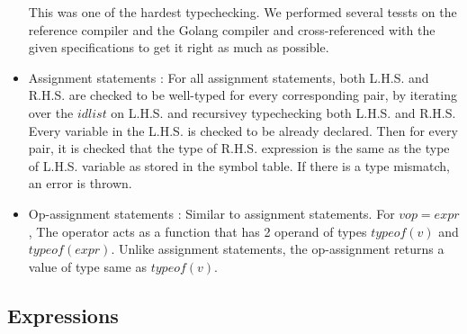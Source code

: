 \documentclass[preprint,12pt]{elsarticle}
\begin{document}
\begin{itemize}
\begin{itemize}
\end{itemize}
This was one of the hardest typechecking. We performed several tessts on the reference compiler and the Golang compiler and cross-referenced with the given specifications to get it right as much as possible.
\item Assignment statements : For all assignment statements, both L.H.S. and R.H.S. are checked to be well-typed for every corresponding pair, by iterating over the $idlist$ on L.H.S. and recursivey typechecking both L.H.S. and R.H.S. Every variable in the L.H.S. is checked to be already declared. Then for every pair, it is checked that the type of R.H.S. expression is the same as the type of L.H.S. variable as stored in the symbol table. If there is a type mismatch, an error is thrown.
\item Op-assignment statements : Similar to assignment statements. For $v op= expr$, The operator acts as a function that has 2 operand of types $typeof(v)$ and $typeof(expr)$. Unlike assignment statements, the op-assignment returns a value of type same as $typeof(v)$.
\end{itemize}

\subsection{Expressions}
\end{document}
